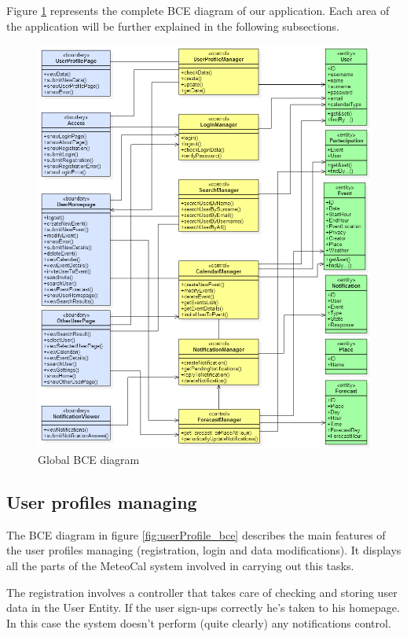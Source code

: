 \documentclass[10pt,a4paper,titlepage]{article}
\begin{document}
Figure \ref{fig:global_bce} represents the complete BCE diagram of our application. Each area of the application will be further explained in the following subsections.
\begin{figure}[h]
\centering
\includegraphics[width=\linewidth]{./bce/global_bce}
\caption[global bce]{Global BCE diagram}
\label{fig:global_bce}
\end{figure}
\clearpage

\subsection{User profiles managing}
The BCE diagram in figure \ref{fig:userProfile_bce} describes the main features of the user profiles managing (registration, login and data modifications). It displays all the parts of the MeteoCal system involved in carrying out this tasks.

The registration involves a controller that takes care of checking and storing user data in the User Entity. If the user sign-ups correctly he's taken to his homepage.  In this case the system doesn't perform  (quite clearly) any notifications control.
\end{document}
